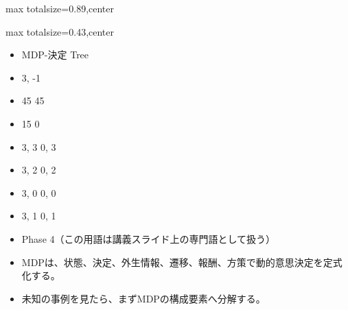 \begin{minipage}[t]{0.58\textwidth}
\begin{adjustbox}{max totalsize={\textwidth}{0.89\textheight},center}
\begin{minipage}{\textwidth}
\end{minipage}
\end{adjustbox}
\end{minipage}


\clearpage
{}
\begin{minipage}[t]{0.405\textwidth}
\begin{adjustbox}{max totalsize={\textwidth}{0.43\textheight},center}
\begin{minipage}{\textwidth}\scriptsize
{}\begin{itemize}
\item MDP-決定 Tree
\item 3, -1
\item 45 45
\item 15 0
\item 3, 3 0, 3
\item 3, 2 0, 2
\item 3, 0 0, 0
\item 3, 1 0, 1
\item Phase 4（この用語は講義スライド上の専門語として扱う）
\end{itemize}\begin{itemize}
\item MDPは、状態、決定、外生情報、遷移、報酬、方策で動的意思決定を定式化する。
\item 未知の事例を見たら、まずMDPの構成要素へ分解する。
\end{itemize}
\end{minipage}
\end{adjustbox}
\end{minipage}\hfill
